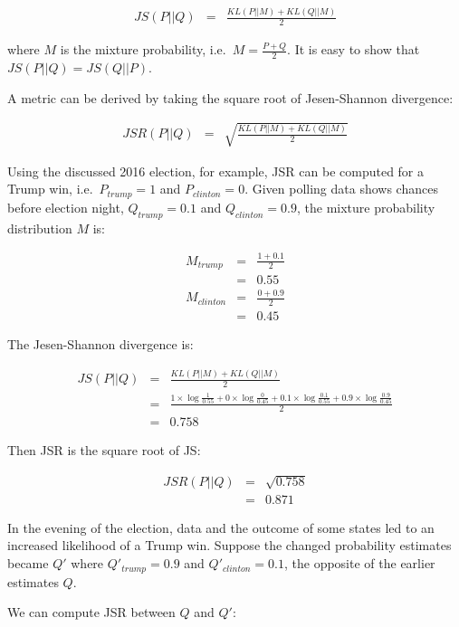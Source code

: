 \documentclass[
  letterpaper,
]{scrbook}
\begin{document}
\[\begin{aligned}
  JS(P||Q) & = & \frac{KL(P||M) + KL(Q||M)}{2}
\end{aligned}\]

where \(M\) is the mixture probability, i.e.~\(M=\frac{P+Q}{2}\). It is
easy to show that \(JS(P||Q)=JS(Q||P)\).

A metric can be derived by taking the square root of Jesen-Shannon
divergence:

\[\begin{aligned}
  JSR(P||Q) & = & \sqrt{\frac{KL(P||M) + KL(Q||M)}{2}}
\end{aligned}\]

Using the discussed 2016 election, for example, JSR can be computed for
a Trump win, i.e.~\(P_{trump}=1\) and \(P_{clinton}=0\). Given polling
data shows chances before election night, \(Q_{trump}=0.1\) and
\(Q_{clinton}=0.9\), the mixture probability distribution \(M\) is:

\[\begin{aligned}
  M_{trump} & = & \frac{1+0.1}{2} \\
            & = & 0.55 \\
  M_{clinton} & = & \frac{0+0.9}{2} \\
            & = & 0.45
\end{aligned}\]

The Jesen-Shannon divergence is:

\[\begin{aligned}
  JS(P||Q)
  & = & \frac{KL(P||M) + KL(Q||M)}{2} \\
  & = & \frac{1\times\log\frac{1}{0.55} + 0\times\log\frac{0}{0.45} + 0.1\times\log\frac{0.1}{0.55} + 0.9\times\log\frac{0.9}{0.45}}{2} \\
  & = & 0.758
\end{aligned}\]

Then JSR is the square root of JS:

\[\begin{aligned}
  JSR(P||Q)
  & = & \sqrt{0.758} \\
  & = & 0.871
\end{aligned}\]

In the evening of the election, data and the outcome of some states led
to an increased likelihood of a Trump win. Suppose the changed
probability estimates became \(Q'\) where \(Q'_{trump}=0.9\) and
\(Q'_{clinton}=0.1\), the opposite of the earlier estimates \(Q\).

We can compute JSR between \(Q\) and \(Q'\):
\end{document}
